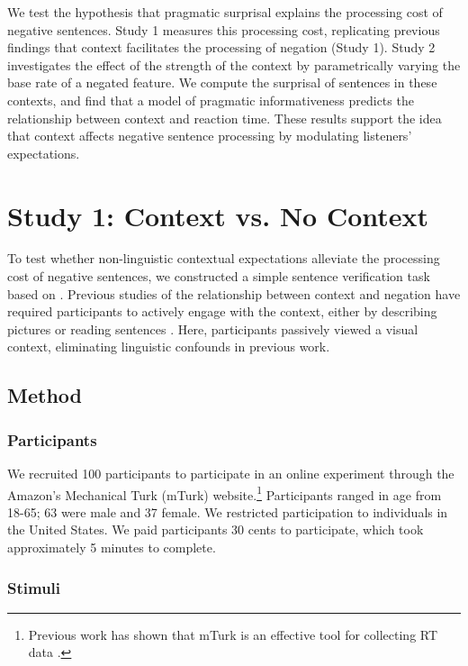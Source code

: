 \documentclass[10pt,letterpaper]{article}
\begin{document}
We test the hypothesis that pragmatic surprisal explains the processing cost of negative sentences. Study 1 measures this processing cost, replicating previous findings that context facilitates the processing of negation (Study 1).  Study 2 investigates the effect of the strength of the context by parametrically varying the base rate of a negated feature.  We compute the surprisal of sentences in these contexts, and find that a model of pragmatic informativeness predicts the relationship between context and reaction time.  These results support the idea that context affects negative sentence processing by modulating listeners' expectations. 

\section{Study 1: Context vs. No Context}

To test whether non-linguistic contextual expectations alleviate the processing cost of negative sentences, we constructed a simple sentence verification task based on .  Previous studies of the relationship between context and negation have required participants to actively engage with the context, either by describing pictures \cite{wason1965} or reading sentences \cite{glenberg1999}.  Here, participants passively viewed a visual context, eliminating linguistic confounds in previous work.  

\subsection{Method}

\subsubsection{Participants}

We recruited 100 participants to participate in an online experiment through the Amazon's Mechanical Turk (mTurk) website.\footnote{Previous work has shown that mTurk is an effective tool for collecting RT data \cite{crump2013}.}  Participants ranged in age from 18-65; 63 were male and 37 female.  We restricted participation to individuals in the United States. We paid participants 30 cents to participate, which took approximately 5 minutes to complete.  

\subsubsection{Stimuli}
\end{document}
